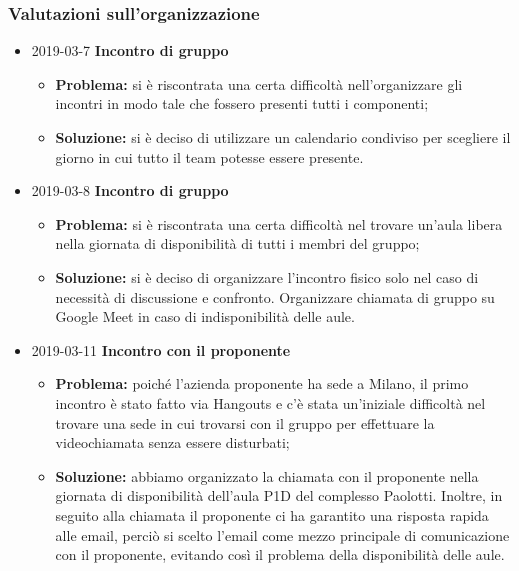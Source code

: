 \subsubsection{Valutazioni sull'organizzazione}
\begin{itemize}	
		
		\item 2019-03-7 \textbf{Incontro di gruppo} \\
		\begin{itemize}
			\item \textbf{Problema:} si è riscontrata una certa difficoltà 				nell'organizzare gli incontri in modo tale che fossero presenti tutti i componenti;
			\item \textbf{Soluzione:} si è deciso di utilizzare un calendario condiviso per scegliere il giorno
		in cui tutto il team potesse essere presente. 
		\end{itemize}
		
		\item 2019-03-8 \textbf{Incontro di gruppo} \\
		\begin{itemize}
			\item \textbf{Problema:} si è riscontrata una certa difficoltà nel trovare un'aula libera nella giornata di disponibilità di tutti i membri del gruppo;
			\item \textbf{Soluzione:} si è deciso di organizzare l'incontro fisico solo nel caso di necessità di discussione e confronto. Organizzare chiamata di gruppo su Google Meet in caso di indisponibilità delle aule. 
		\end{itemize}
						
						
		\item 2019-03-11 \textbf{Incontro con il proponente} \\
		\begin{itemize}
			\item \textbf{Problema:} poiché l'azienda proponente ha sede a Milano, il primo incontro è stato fatto
		via Hangouts e c'è stata un'iniziale difficoltà nel trovare una sede in cui 
		trovarsi con il gruppo per effettuare la videochiamata senza essere disturbati;
			\item \textbf{Soluzione:} abbiamo organizzato la chiamata con il proponente nella giornata di disponibilità dell'aula P1D del complesso Paolotti. Inoltre, in seguito alla chiamata il proponente ci ha garantito una risposta rapida alle email, perciò si scelto l'email come mezzo principale di comunicazione con il proponente, evitando così il problema della disponibilità delle aule.
		\end{itemize}
		

\end{itemize}
